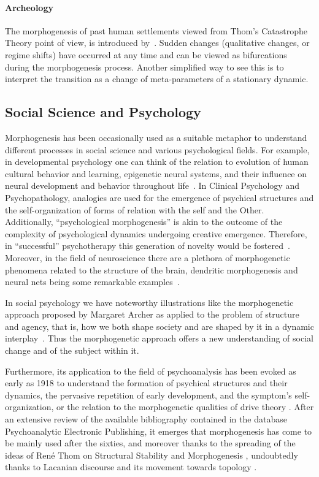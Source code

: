 \documentclass[fleqn,10pt]{wlscirep}
\begin{document}
\paragraph{Archeology}

The morphogenesis of past human settlements viewed from Thom's Catastrophe Theory point of view, is introduced by~\cite{renfrew1978trajectory}. Sudden changes (qualitative changes, or regime shifts) have occurred at any time and can be viewed as bifurcations during the morphogenesis process. Another simplified way to see this is to interpret the transition as a change of meta-parameters of a stationary dynamic.




\subsection*{Social Science and Psychology}


Morphogenesis has been occasionally used as a suitable metaphor to understand different processes in social science and various psychological fields. For example, in developmental psychology one can think of the relation to evolution of human cultural behavior and learning, epigenetic neural systems, and their influence on neural development and behavior throughout life~\cite{hart_held_2013}. In Clinical Psychology and Psychopathology, analogies are used for the emergence of psychical structures and the self-organization of forms of relation with the self and the Other. Additionally, “psychological morphogenesis” is akin to the outcome of the complexity of psychological dynamics undergoing creative emergence. Therefore, in “successful” psychotherapy this generation of novelty would be fostered~\cite{piers_self-organizing_2007}. Moreover, in the field of neuroscience there are a plethora of morphogenetic phenomena related to the structure of the brain, dendritic morphogenesis and neural nets being some remarkable examples~\cite{_issues_2013}.

In social psychology we have noteworthy illustrations like the morphogenetic approach proposed by Margaret Archer as applied to the problem of structure and agency, that is, how we both shape society and are shaped by it in a dynamic interplay~\cite{archer_margaret_1999}. Thus the morphogenetic approach offers a new understanding of social change and of the subject within it.  

Furthermore, its application to the field of psychoanalysis has been evoked as early as 1918 to understand the formation of psychical structures and their dynamics, the pervasive repetition of early development, and the symptom’s self-organization, or the relation to the morphogenetic qualities of drive theory \cite{benedek_instinct_1973}. After an extensive review of the available bibliography contained in the database Psychoanalytic Electronic Publishing, it emerges that morphogenesis has come to be mainly used after the sixties, and moreover thanks to the spreading of the ideas of René Thom on Structural Stability and Morphogenesis \cite{de_luca_picione_processes_2016}, undoubtedly thanks to Lacanian discourse and its movement towards topology \cite{nasio_five_1998}. 
\end{document}
